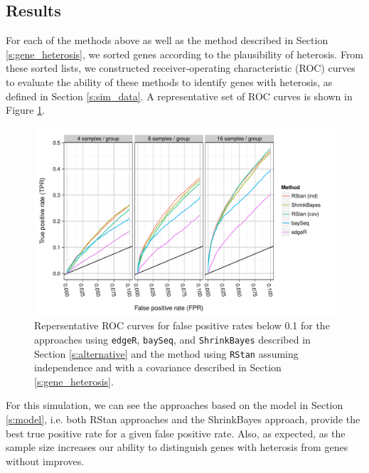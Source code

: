 \documentclass[useAMS,usenatbib,referee]{biom}
\begin{document}
\subsection{Results}

For each of the methods above as well as the method described in Section \ref{s:gene_heterosis}, we sorted genes according to the plausibility of heterosis. From these sorted lists, we constructed receiver-operating characteristic (ROC) curves to evaluate the ability of these methods to identify genes with heterosis, as defined in Section \ref{s:sim_data}. A representative set of ROC curves is shown in Figure \ref{f:roc}. 
\begin{figure}[htbp]
\centerline{\includegraphics[width=\textwidth]{exampleROC0_1}}
\caption{Repersentative ROC curves for false positive rates below 0.1 for the approaches using {\tt edgeR}, {\tt baySeq},  and {\tt ShrinkBayes} described in Section \ref{s:alternative} and the method using {\tt RStan} assuming independence and with a covariance described in Section \ref{s:gene_heterosis}.}
\label{f:roc}
\end{figure}
For this simulation, we can see the approaches based on the model in Section \ref{s:model}, i.e. both RStan approaches and the ShrinkBayes approach, provide the best true positive rate for a given false positive rate. Also, as expected, as the sample size increases our ability to distinguish genes with heterosis from genes without improves.
\end{document}
